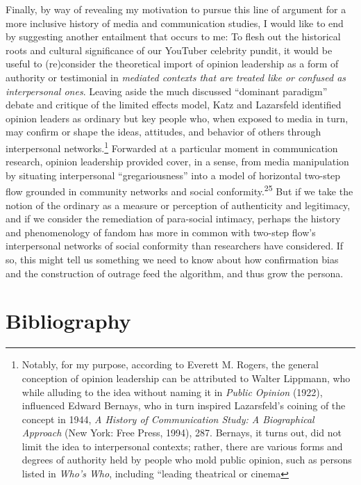 \documentclass{tufte-handout}
\begin{document}
Finally, by way of revealing my motivation to pursue this line of
argument for a more inclusive history of media and communication
studies, I would like to end by suggesting another entailment that
occurs to me: To flesh out the historical roots and cultural
significance of our YouTuber celebrity pundit, it would be useful to
(re)consider the theoretical import of opinion leadership as a form of
authority or testimonial in \emph{mediated contexts that are treated
like or confused as interpersonal ones}. Leaving aside the much
discussed ``dominant paradigm'' debate and critique of the limited
effects model, Katz and Lazarsfeld identified opinion leaders as
ordinary but key people who, when exposed to media in turn, may confirm
or shape the ideas, attitudes, and behavior of others through
interpersonal networks.\footnote{Notably, for my purpose, according to
  Everett M. Rogers, the general conception of opinion leadership can be
  attributed to Walter Lippmann, who while alluding to the idea without
  naming it in \emph{Public Opinion} (1922), influenced Edward Bernays,
  who in turn inspired Lazarsfeld's coining of the concept in 1944,
  \emph{A History of Communication Study: A Biographical Approach} (New
  York: Free Press, 1994), 287. Bernays, it turns out, did not limit the
  idea to interpersonal contexts; rather, there are various forms and
  degrees of authority held by people who mold public opinion, such as
  persons listed in \emph{Who's Who}, including ``leading theatrical or
  cinema} Forwarded at a particular moment in communication
research, opinion leadership provided cover, in a sense, from media
manipulation by situating interpersonal ``gregariousness'' into a model
of horizontal two-step flow grounded in community networks and social
conformity.\textsuperscript{25} But if we take the notion of the ordinary as a measure
or perception of authenticity and legitimacy, and if we consider the
remediation of para-social intimacy, perhaps the history and
phenomenology of fandom has more in common with two-step flow's
interpersonal networks of social conformity than researchers have
considered. If so, this might tell us something we need to know about
how confirmation bias and the construction of outrage feed the
algorithm, and thus grow the persona.







\section{Bibliography}\label{bibliography}
\end{document}
